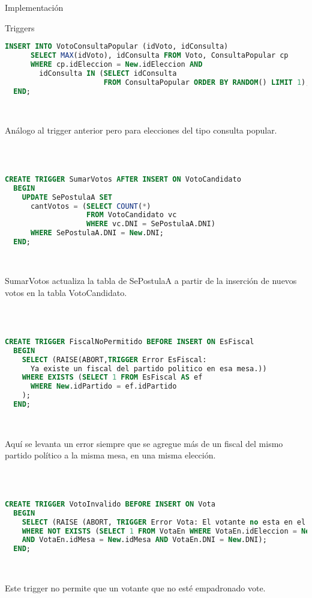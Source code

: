 \begin{section}{Implementaci\'on}
\begin{subsection}{Triggers}
\begin{lstlisting}[language=SQL, basicstyle=\footnotesize]
    INSERT INTO VotoConsultaPopular (idVoto, idConsulta) 
      SELECT MAX(idVoto), idConsulta FROM Voto, ConsultaPopular cp
      WHERE cp.idEleccion = New.idEleccion AND
        idConsulta IN (SELECT idConsulta
                       FROM ConsultaPopular ORDER BY RANDOM() LIMIT 1);
  END;

\end{lstlisting} 

~

\noindent An\'alogo al trigger anterior pero para elecciones del tipo consulta popular.

~

\begin{lstlisting}[language=SQL, basicstyle=\footnotesize]

CREATE TRIGGER SumarVotos AFTER INSERT ON VotoCandidato
  BEGIN       
    UPDATE SePostulaA SET 
      cantVotos = (SELECT COUNT(*)
                   FROM VotoCandidato vc 
                   WHERE vc.DNI = SePostulaA.DNI)
      WHERE SePostulaA.DNI = New.DNI;     
  END;


\end{lstlisting} 

~

\noindent SumarVotos actualiza la tabla de SePostulaA a partir de la inserci\'on de nuevos votos en la tabla VotoCandidato.

~

\begin{lstlisting}[language=SQL, basicstyle=\footnotesize]

CREATE TRIGGER FiscalNoPermitido BEFORE INSERT ON EsFiscal  
  BEGIN
    SELECT (RAISE(ABORT,TRIGGER Error EsFiscal: 
      Ya existe un fiscal del partido politico en esa mesa.))
    WHERE EXISTS (SELECT 1 FROM EsFiscal AS ef 
      WHERE New.idPartido = ef.idPartido
    );    
  END;


\end{lstlisting} 

~

\noindent Aqu\'i se levanta un error siempre que se agregue m\'as de un fiscal del mismo partido pol\'itico a la misma mesa, en una misma elecci\'on.

~

\begin{lstlisting}[language=SQL, basicstyle=\footnotesize]

CREATE TRIGGER VotoInvalido BEFORE INSERT ON Vota 
  BEGIN
    SELECT (RAISE (ABORT, TRIGGER Error Vota: El votante no esta en el padron.))
    WHERE NOT EXISTS (SELECT 1 FROM VotaEn WHERE VotaEn.idEleccion = New.idEleccion
    AND VotaEn.idMesa = New.idMesa AND VotaEn.DNI = New.DNI);
  END;


\end{lstlisting} 

~

\noindent Este trigger no permite que un votante que no est\'e empadronado vote.

~

\end{subsection}
\end{section}

